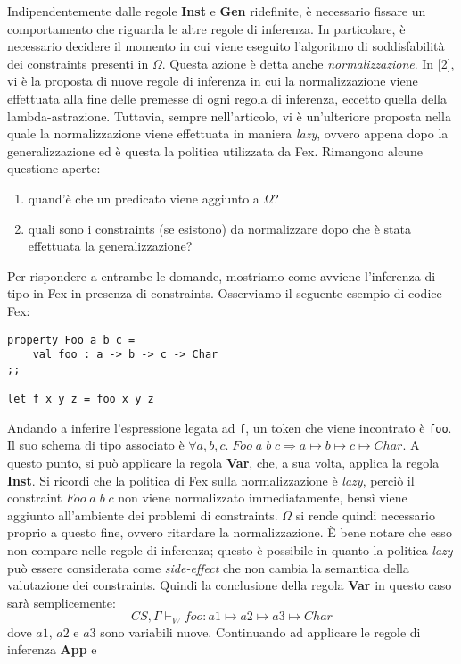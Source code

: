 \documentclass[10pt,a4paper]{article}
\begin{document}
Indipendentemente dalle regole \textbf{Inst} e \textbf{Gen} ridefinite, è necessario fissare un comportamento che
riguarda le altre regole di inferenza. In particolare, è necessario decidere il momento in cui viene eseguito l'algoritmo
di soddisfabilità dei constraints presenti in $ \Omega $. Questa azione è detta anche \textit{normalizzazione}.
In [2], vi è la proposta di nuove regole di inferenza in cui la normalizzazione viene effettuata alla fine delle
premesse di ogni regola di inferenza, eccetto quella della lambda-astrazione. Tuttavia, sempre nell'articolo, vi è
un'ulteriore proposta nella quale la normalizzazione viene effettuata in maniera \textit{lazy}, ovvero appena dopo
la generalizzazione ed è questa la politica utilizzata da Fex. Rimangono alcune questione aperte:
\begin{enumerate}
    \item quand'è che un predicato viene aggiunto a $ \Omega $?
    \item quali sono i constraints (se esistono) da normalizzare dopo che è stata effettuata la generalizzazione?
\end{enumerate}
Per rispondere a entrambe le domande, mostriamo come avviene l'inferenza di tipo in Fex in presenza di constraints.
Osserviamo il seguente esempio di codice Fex:
\begin{lstlisting}
property Foo a b c =
    val foo : a -> b -> c -> Char
;;

let f x y z = foo x y z
\end{lstlisting}
Andando a inferire l'espressione legata ad \texttt{f}, un token che viene incontrato è \texttt{foo}. Il suo schema di
tipo associato è $ \forall a, b, c. \; Foo \; a \; b \; c \Rightarrow a \mapsto b \mapsto c \mapsto Char $. A questo
punto, si può applicare la regola \textbf{Var}, che, a sua volta, applica la regola
\textbf{Inst}. Si ricordi che la politica di Fex sulla normalizzazione è \textit{lazy}, perciò
il constraint $ Foo \; a \; b \; c $ non viene normalizzato immediatamente, bensì viene aggiunto all'ambiente dei
problemi di constraints. $ \Omega $ si rende quindi necessario proprio a questo fine, ovvero ritardare la normalizzazione.
\`E bene notare che esso non compare nelle regole di inferenza; questo è possibile in quanto la politica \textit{lazy}
può essere considerata come \textit{side-effect} che non cambia la semantica della valutazione dei constraints.
Quindi la conclusione della regola \textbf{Var} in questo caso sarà semplicemente:
\[ CS, \Gamma \vdash_W foo : a1 \mapsto a2 \mapsto a3 \mapsto Char \]
dove $ a1 $, $ a2 $ e $ a3 $ sono variabili nuove. Continuando ad applicare le regole di inferenza \textbf{App} e
\end{document}
